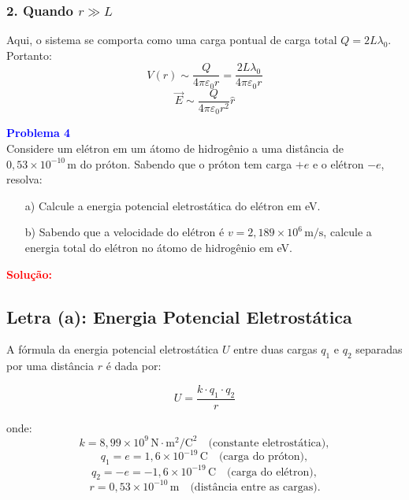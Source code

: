 \documentclass[a4paper,12pt]{article}
\begin{document}
\subsubsection*{2. Quando \( r \gg L \)}

Aqui, o sistema se comporta como uma carga pontual de carga total \( Q = 2L\lambda_0 \). Portanto:
\begin{equation}
V(r) \sim \frac{Q}{4\pi\varepsilon_0 r} = \frac{2L\lambda_0}{4\pi\varepsilon_0 r}
\end{equation}
\begin{equation}
\vec{E} \sim \frac{Q}{4\pi\varepsilon_0 r^2} \hat{r}
\end{equation}

\begin{flushleft}
\textbf{\textcolor{blue}{\Large Problema 4}}\\

Considere um elétron em um átomo de hidrogênio a uma distância de \( 0{,}53 \times 10^{-10} \, \text{m} \) do próton. 
Sabendo que o próton tem carga \( +e \) e o elétron \( -e \), resolva:

\begin{enumerate}
    \item[a)] Calcule a energia potencial eletrostática do elétron em eV.
    \item[b)] Sabendo que a velocidade do elétron é \( v = 2{,}189 \times 10^6 \, \text{m/s} \), 
    calcule a energia total do elétron no átomo de hidrogênio em eV.
\end{enumerate}

\textcolor{red}{\textbf{Solução:}}\\

\subsection*{Letra (a): Energia Potencial Eletrostática}

A fórmula da energia potencial eletrostática \( U \) entre duas cargas \( q_1 \) e \( q_2 \) separadas por uma distância \( r \) é dada por:

\begin{equation}
U = \frac{k \cdot q_1 \cdot q_2}{r}
\end{equation}

onde:
\begin{equation}
k = 8,99 \times 10^9 \, \text{N} \cdot \text{m}^2 / \text{C}^2 \quad \text{(constante eletrostática)},
\end{equation}
\begin{equation}
q_1 = e = 1,6 \times 10^{-19} \, \text{C} \quad \text{(carga do próton)},
\end{equation}
\begin{equation}
q_2 = -e = -1,6 \times 10^{-19} \, \text{C} \quad \text{(carga do elétron)},
\end{equation}
\begin{equation}
r = 0,53 \times 10^{-10} \, \text{m} \quad \text{(distância entre as cargas)}.
\end{equation}


\end{flushleft}
\end{document}
